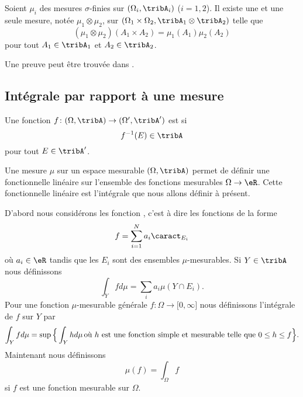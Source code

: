 \begin{theorem}
    Soient \( \mu_i\) des mesures $\sigma$-finies sur \( (\Omega_i,\tribA_i)\) (\( i=1,2\)). Il existe une et une seule mesure, notée \( \mu_1\otimes \mu_2\), sur \( (\Omega_1\times\Omega_2,\tribA_1\otimes\tribA_2)\) telle que
    \begin{equation}
        (\mu_1\otimes\mu_2)(A_1\times A_2)=\mu_1(A_1)\mu_2(A_2)
    \end{equation}
    pour tout \( A_1\in \tribA_1\) et \( A_2\in\tribA_2\).
\end{theorem}
Une preuve peut être trouvée dans \cite{FubiniBMauray}.

\subsection{Intégrale par rapport à une mesure}

Une fonction \( f\colon (\Omega,\tribA)\to (\Omega',\tribA')\) est  si 
\begin{equation}
    f^{-1}(E)\in\tribA
\end{equation}
pour tout \( E\in\tribA'\).


Une mesure \( \mu\) sur un espace mesurable \( (\Omega,\tribA)\) permet de définir une fonctionnelle linéaire sur l'ensemble des fonctions mesurables \( \Omega\to \eR\). Cette fonctionnelle linéaire est l'intégrale que nous allons définir à présent.

D'abord nous considérons les fonction , c'est à dire les fonctions de la forme
\begin{equation}
    f=\sum_{i=1}^Na_i\caract_{E_i}
\end{equation}
où \( a_i\in\eR\) tandis que les \( E_i\) sont des ensembles \( \mu\)-mesurables. Si \( Y\in \tribA\) nous définissons
\begin{equation}
    \int_Yfd\mu=\sum_ia_i\mu(Y\cap E_i).
\end{equation}
Pour une fonction \( \mu\)-mesurable générale \( f\colon \Omega\to \mathopen[ 0 , \infty \mathclose]\) nous définissons l'intégrale de \( f\) sur \( Y\) par
\begin{equation}        \label{EqDefintYfdmu}
    \int_Yfd\mu=\sup\Big\{ \int_Yhd\mu\,\text{où \( h\) est une fonction simple et mesurable telle que \( 0\leq h\leq f\)} \Big\}.
\end{equation}
Maintenant nous définissons
\begin{equation}
    \mu(f)=\int_{\Omega}f
\end{equation}
si \( f\) est une fonction mesurable sur \( \Omega\).

